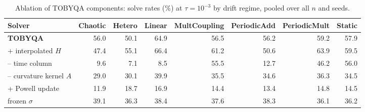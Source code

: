 \begin{table}[t]
\centering\footnotesize
\setlength{\tabcolsep}{3pt}
\caption{Ablation of TOBYQA components: solve rates (\%) at $\tau=10^{-3}$ by drift regime, pooled over all $n$ and seeds.}
\label{tab:ablation}
\begin{tabular}{lrrrrrrr}
\toprule
Solver & Chaotic & Hetero & Linear & MultCoupling & PeriodicAdd & PeriodicMult & Static \\
\midrule
\textbf{TOBYQA} & 56.0 & 50.1 & 64.9 & 56.5 & 56.2 & 59.2 & 57.9 \\
\quad + interpolated $H$ & 47.4 & 55.1 & 66.4 & 61.2 & 50.6 & 63.9 & 59.5 \\
\quad -- time column & 9.6 & 7.1 & 8.5 & 55.5 & 12.7 & 46.2 & 56.0 \\
\quad -- curvature kernel $A$ & 29.0 & 30.1 & 39.9 & 35.5 & 34.6 & 36.3 & 34.5 \\
\quad + Powell update & 11.9 & 18.7 & 16.9 & 14.4 & 13.4 & 14.8 & 14.5 \\
\quad frozen $\sigma$ & 39.1 & 36.3 & 38.4 & 37.6 & 38.3 & 36.1 & 36.2 \\
\bottomrule
\end{tabular}
\end{table}